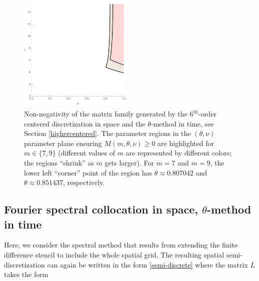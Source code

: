 \documentclass[a4paper]{article}
\newcommand{\te}{\theta}
\begin{document}
\begin{figure}
\begin{center}
\includegraphics[width=0.48\textwidth]{fig_7stencilm79.pdf}
\caption{Non-negativity of the matrix family generated by the $6^\text{th}$-order centered discretization in space and the $\theta$-method in time, see Section \ref{highercentered}. The parameter regions in the $(\te,\nu)$ parameter plane ensuring $M(m,\te,\nu)\ge 0$ are highlighted for $m\in\{7, 9\}$ (different values of $m$ are represented by different colors; the regions ``shrink'' as $m$ gets larger). For $m=7$ and $m=9$, the lower left ``corner'' point of the region has $\theta\approx 0.807042$ and $\theta\approx 0.851437$, respectively.}\label{fig_7stencilm79}
\end{center}
\end{figure}


\subsection{Fourier spectral collocation in space, $\theta$-method in time}\label{spectrcoll}
Here, we consider the spectral method that results from extending the
finite difference stencil to include the whole spatial grid.  The resulting spatial 
semi-discretization can again be written in the form \eqref{semi-discrete}
where the matrix $L$ takes the form 
\end{document}
